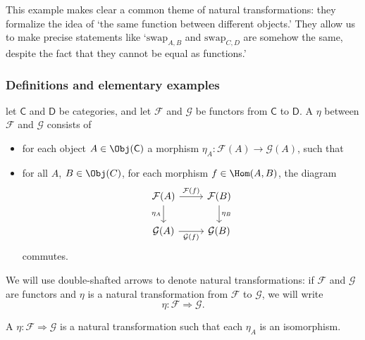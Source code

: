 \documentclass[main.tex]{subfiles}
\begin{document}
This example makes clear a common theme of natural transformations: they formalize the idea of `the same function between different objects.' They allow us to make precise statements like `$\mathrm{swap}_{A, B}$ and $\mathrm{swap}_{C, D}$ are somehow the same, despite the fact that they cannot be equal as functions.'


\subsubsection{Definitions and elementary examples}

\begin{definition}
  \label{def:naturaltransformation}
  let $\mathsf{C}$ and $\mathsf{D}$ be categories, and let $\mathcal{F}$ and $\mathcal{G}$ be functors from $\mathsf{C}$ to $\mathsf{D}$. A  $\eta$ between $\mathcal{F}$ and $\mathcal{G}$ consists of
  \begin{itemize}
    \item for each object $A \in \Obj(\mathsf{C})$ a morphism $\eta_{A}\colon \mathcal{F}(A) \to \mathcal{G}(A)$, such that
    \item for all $A$, $B \in \Obj(C)$, for each morphism $f \in \Hom(A,B)$, the diagram
      \begin{equation*}
        \begin{tikzcd}
          \mathcal{F}(A)\arrow[d, swap, "\eta_{A}"] \arrow[r, "\mathcal{F}(f)"] & \mathcal{F}(B)\arrow[d, "\eta_{B}"] \\
          \mathcal{G}(A) \arrow[r, swap, "\mathcal{G}(f)"] & \mathcal{G}(B)
        \end{tikzcd}
      \end{equation*}
      commutes.
  \end{itemize}
\end{definition}

We will use double-shafted arrows to denote natural transformations: if $\mathcal{F}$ and $\mathcal{G}$ are functors and $\eta$ is a natural transformation from $\mathcal{F}$ to $\mathcal{G}$, we will write
\begin{equation*}
  \eta\colon \mathcal{F} \Rightarrow \mathcal{G}.
\end{equation*}

\begin{definition}
  \label{def:naturalisomorphism}
  A  $\eta\colon \mathcal{F} \Rightarrow \mathcal{G}$ is a natural transformation such that each $\eta_{A}$ is an isomorphism.
\end{definition}
\end{document}
